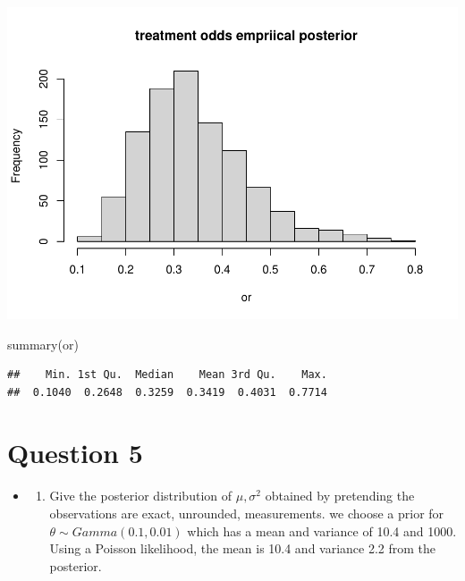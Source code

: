 \documentclass[
]{book}
\newenvironment{Shaded}{\begin{snugshade}}{\end{snugshade}}
\newcommand{\FunctionTok}[1]{\textcolor[rgb]{0.00,0.00,0.00}{#1}}
\newcommand{\NormalTok}[1]{#1}
\providecommand{\tightlist}{%
  \setlength{\itemsep}{0pt}\setlength{\parskip}{0pt}}
\theoremstyle{definition}
\theoremstyle{definition}
\theoremstyle{definition}
\theoremstyle{definition}
\theoremstyle{remark}
\begin{document}
\includegraphics{_main_files/figure-latex/unnamed-chunk-35-2.pdf}

\begin{Shaded}
\begin{Highlighting}[]
  \FunctionTok{summary}\NormalTok{(or)}
\end{Highlighting}
\end{Shaded}

\begin{verbatim}
##    Min. 1st Qu.  Median    Mean 3rd Qu.    Max. 
##  0.1040  0.2648  0.3259  0.3419  0.4031  0.7714
\end{verbatim}

\hypertarget{question-5}{%
\section*{Question 5}\label{question-5}}

\begin{itemize}
\item
  \begin{enumerate}
  \def\labelenumi{(\alph{enumi})}
  \tightlist
  \item
    Give the posterior distribution of \(\mu, \sigma^2\) obtained by pretending the observations are exact, unrounded, measurements. we choose a prior for \(\theta \sim Gamma(0.1,0.01)\) which has a mean and variance of 10.4 and 1000. Using a Poisson likelihood, the mean is 10.4 and variance 2.2 from the posterior.
  \end{enumerate}
\end{itemize}
\end{document}
